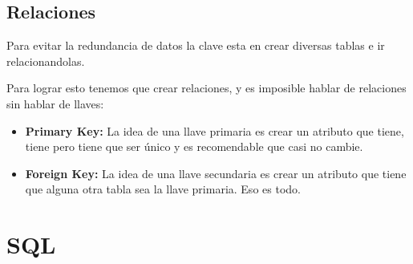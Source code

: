 \documentclass[12pt, fleqn]{report}                             %
\begin{document}
        \clearpage
        \section{Relaciones}

            Para evitar la redundancia de datos la clave esta en crear diversas tablas
            e ir relacionandolas.

            Para lograr esto tenemos que crear relaciones, y es imposible hablar de relaciones
            sin hablar de llaves:


            \begin{itemize}
                \item
                    \textbf{Primary Key:}
                    La idea de una llave primaria es crear un atributo que tiene, tiene pero
                    tiene que ser único y es recomendable que casi no cambie.


                \item
                    \textbf{Foreign Key:}
                    La idea de una llave secundaria es crear un atributo que tiene que alguna otra
                    tabla sea la llave primaria. Eso es todo.

            \end{itemize}


 










            
        





    \chapter{SQL}

        \clearpage
\end{document}
